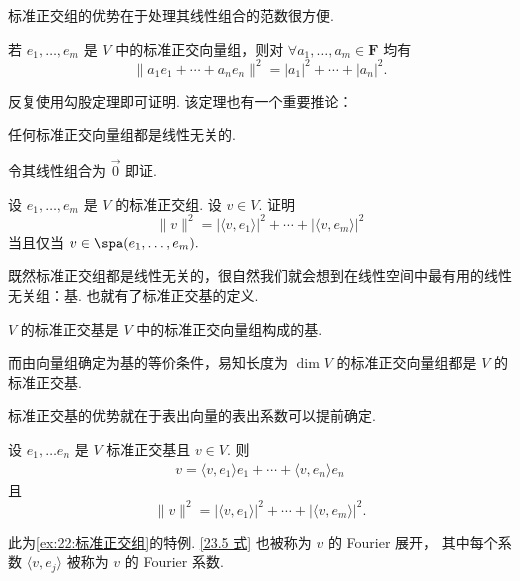 标准正交组的优势在于处理其线性组合的范数很方便.

\begin{theorem}
    若 $e_1, \ldots , e_m$ 是 $ V $ 中的标准正交向量组，则对 $\forall a_1, \ldots, a_m \in \mathbf{F}$ 均有
    \[ \lVert a_1e_1 + \cdots + a_ne_n\rVert^2 = \lvert a_1 \rvert^2 + \cdots + \lvert a_n \rvert^2.\]
\end{theorem}

反复使用勾股定理即可证明. 该定理也有一个重要推论：

\begin{theorem}
    任何标准正交向量组都是线性无关的.
\end{theorem}

令其线性组合为 $ \vec{0} $ 即证.

\begin{example} \label{ex:22:标准正交组}
    设 $e_1, \ldots , e_m$ 是 $ V $ 的标准正交组. 设 $ v \in V $. 证明
    \[ \lVert v \rVert^2 = \lvert \langle v, e_1\rangle \rvert^2 + \cdots + \lvert \langle v, e_m\rangle \rvert^2 \]
    当且仅当 $ v \in \spa(e_1, \ldots , e_m).$
\end{example}

\vspace{2ex}

既然标准正交组都是线性无关的，很自然我们就会想到在线性空间中最有用的线性无关组：基.
也就有了标准正交基的定义.

\begin{definition}
    $ V $ 的标准正交基是 $ V $ 中的标准正交向量组构成的基.
\end{definition}

而由向量组确定为基的等价条件，易知长度为 $\dim V$ 的标准正交向量组都是
$ V $ 的标准正交基.

标准正交基的优势就在于表出向量的表出系数可以提前确定.

\begin{theorem}
    设 $e_1, \ldots e_n$ 是 $ V $ 标准正交基且 $ v \in V$. 则
    \begin{gather}
        v = \langle v, e_1 \rangle e_1 + \cdots + \langle v, e_n \rangle e_n
    \end{gather} 
    且
    \[ \lVert v \rVert^2 = \lvert \langle v, e_1\rangle \rvert^2 + \cdots + \lvert \langle v, e_m\rangle \rvert^2. \]
\end{theorem}

此为\autoref{ex:22:标准正交组}的特例. \ref{23.5 式} 也被称为 $ v $ 的 Fourier 展开，
其中每个系数 $ \langle v, e_j \rangle $ 被称为 $ v $ 的 Fourier 系数. 

